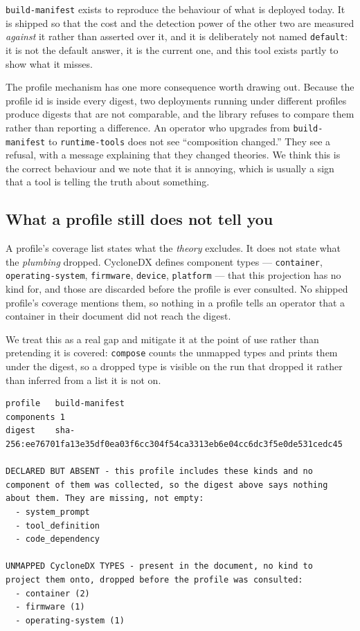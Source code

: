 \documentclass[11pt]{article}
\begin{document}
\texttt{build-manifest} exists to reproduce the behaviour of what is deployed
today. It is shipped so that the cost and the detection power of the other two
are measured \emph{against} it rather than asserted over it, and it is
deliberately not named \texttt{default}: it is not the default answer, it is
the current one, and this tool exists partly to show what it misses.

The profile mechanism has one more consequence worth drawing out. Because the
profile id is inside every digest, two deployments running under different
profiles produce digests that are not comparable, and the library refuses to
compare them rather than reporting a difference. An operator who upgrades from
\texttt{build-manifest} to \texttt{runtime-tools} does not see ``composition
changed.'' They see a refusal, with a message explaining that they changed
theories. We think this is the correct behaviour and we note that it is
annoying, which is usually a sign that a tool is telling the truth about
something.

\subsection{What a profile still does not tell you}

A profile's coverage list states what the \emph{theory} excludes. It does not
state what the \emph{plumbing} dropped. CycloneDX defines component types ---
\texttt{container}, \texttt{operating-system}, \texttt{firmware},
\texttt{device}, \texttt{platform} --- that this projection has no kind for,
and those are discarded before the profile is ever consulted. No shipped
profile's coverage mentions them, so nothing in a profile tells an operator
that a container in their document did not reach the digest.

We treat this as a real gap and mitigate it at the point of use rather than
pretending it is covered: \texttt{compose} counts the unmapped types and
prints them under the digest, so a dropped type is visible on the run that
dropped it rather than inferred from a list it is not on.

\begin{lstlisting}
profile   build-manifest
components 1
digest    sha-256:ee76701fa13e35df0ea03f6cc304f54ca3313eb6e04cc6dc3f5e0de531cedc45

DECLARED BUT ABSENT - this profile includes these kinds and no
component of them was collected, so the digest above says nothing
about them. They are missing, not empty:
  - system_prompt
  - tool_definition
  - code_dependency

UNMAPPED CycloneDX TYPES - present in the document, no kind to
project them onto, dropped before the profile was consulted:
  - container (2)
  - firmware (1)
  - operating-system (1)
\end{lstlisting}
\end{document}
